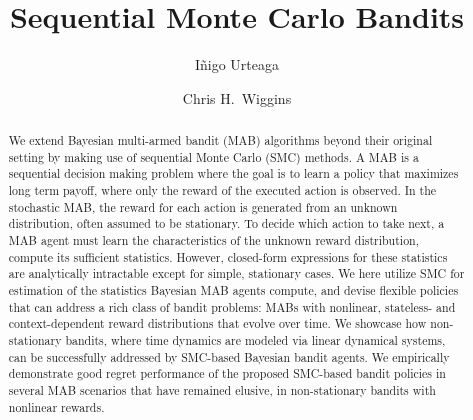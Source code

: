 \documentclass{article}
\begin{document}
\title{Sequential Monte Carlo Bandits}

\author[1, 2]{
	I\~{n}igo Urteaga
}
\author[3]{
	Chris H.~Wiggins
}


\affil[ ]{{\footnotesize}}
	

\maketitle

\begin{abstract}
We extend Bayesian multi-armed bandit (MAB) algorithms
beyond their original setting
by making use of sequential Monte Carlo (SMC) methods.
A MAB is a sequential decision making problem
where the goal is to learn a policy that maximizes long term payoff,
where only the reward of the executed action is observed.
In the stochastic MAB, the reward for each action is generated from an unknown distribution, often assumed to be stationary.
To decide which action to take next,
a MAB agent must learn the characteristics of the unknown reward distribution, \eg compute its sufficient statistics.
However, closed-form expressions for these statistics are analytically intractable except for simple, stationary cases.
We here utilize SMC for estimation of the statistics Bayesian MAB agents compute,
and devise flexible policies that can address a rich class of bandit problems:
\ie MABs with nonlinear, stateless- and context-dependent reward distributions that evolve over time.
We showcase how non-stationary bandits,
where time dynamics are modeled via linear dynamical systems,
can be successfully addressed by SMC-based Bayesian bandit agents.
We empirically demonstrate good regret performance of the proposed SMC-based bandit policies in several MAB scenarios that have remained elusive,
\ie in non-stationary bandits with nonlinear rewards.
\end{abstract}

\end{document}

